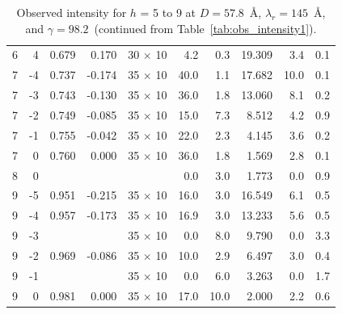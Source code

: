 \begin{table}[htbp]
\begin{tabular}{rrrrcrrrrr}
  6        & 4        & 0.679    & 0.170    & 30 $\times$ 10 & 4.2      & 0.3      & 19.309    & 3.4      & 0.1 \\
  7        & -4       & 0.737    & -0.174   & 35 $\times$ 10 & 40.0     & 1.1      & 17.682    & 10.0     & 0.1 \\
  7        & -3       & 0.743    & -0.130   & 35 $\times$ 10 & 36.0     & 1.8      & 13.060    & 8.1      & 0.2 \\
  7        & -2       & 0.749    & -0.085   & 35 $\times$ 10 & 15.0     & 7.3      & 8.512     & 4.2      & 0.9 \\
  7        & -1       & 0.755    & -0.042   & 35 $\times$ 10 & 22.0     & 2.3      & 4.145     & 3.6      & 0.2 \\
  7        & 0        & 0.760    & 0.000    & 35 $\times$ 10 & 36.0     & 1.8      & 1.569     & 2.8      & 0.1 \\
  8        & 0        &          &          &                & 0.0      & 3.0      & 1.773     & 0.0      & 0.9 \\
  9        & -5       & 0.951    & -0.215   & 35 $\times$ 10 & 16.0     & 3.0      & 16.549    & 6.1      & 0.5 \\
  9        & -4       & 0.957    & -0.173   & 35 $\times$ 10 & 16.9     & 3.0      & 13.233    & 5.6      & 0.5 \\
  9        & -3       &          &          & 35 $\times$ 10 & 0.0      & 8.0      & 9.790     & 0.0      & 3.3 \\
  9        & -2       & 0.969    & -0.086   & 35 $\times$ 10 & 10.0     & 2.9      & 6.497     & 3.0      & 0.4 \\
  9        & -1       &          &          & 35 $\times$ 10 & 0.0      & 6.0      & 3.263     & 0.0      & 1.7 \\
  9        & 0        & 0.981    & 0.000    & 35 $\times$ 10 & 17.0     & 10.0     & 2.000     & 2.2      & 0.6 \\
    \hline
  \end{tabular}
  \caption[Observed intensity for $h$ = 5 to 9 at $D=57.8$~\AA, $\lambda_r=145$~\AA, and 
  $\gamma=98.2$\textdegree\ (continued from Table~\ref{tab:obs_intensity1})]
  {Observed intensity for $h$ = 5 to 9 at $D=57.8$~\AA, $\lambda_r=145$~\AA, and 
  $\gamma=98.2$\textdegree\ (continued from Table~\ref{tab:obs_intensity1}).}
  \label{tab:obs_intensity2}
\end{table}

